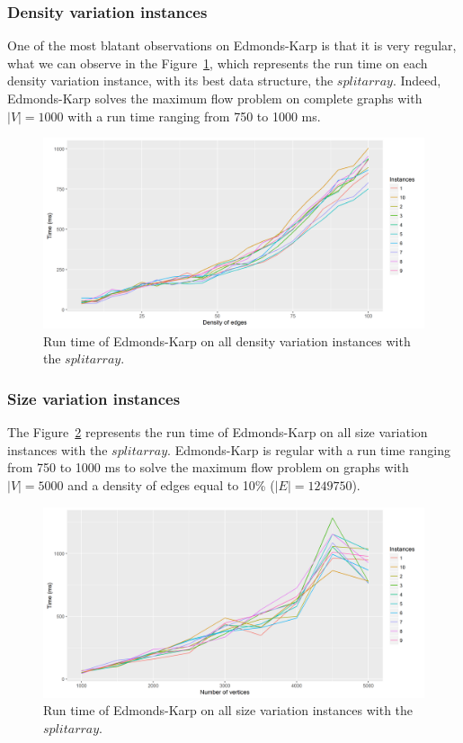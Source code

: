 \subsubsection{Density variation instances}
One of the most blatant observations on Edmonds-Karp is that it is very regular, what we can observe in the Figure~\ref{fig:EKmean}, which represents the run time on each density variation instance, with its best data structure, the $split array$. Indeed, Edmonds-Karp solves the maximum flow problem on complete graphs with $|V|=1000$ with a run time ranging from 750 to 1000 ms.
\begin{figure}[H]
\begin{center}
\includegraphics[scale=0.6]{images/results/EKmean.png}
\caption{Run time of Edmonds-Karp on all density variation instances with the $split array$.}
\label{fig:EKmean}
\end{center}
\end{figure}
\subsubsection{Size variation instances}
The Figure~\ref{fig:EKmeansize} represents the run time of Edmonds-Karp on all size variation instances with the $split array$. Edmonds-Karp is regular with a run time ranging from 750 to 1000 ms to solve the maximum flow problem on graphs with $|V|=5000$ and a density of edges equal to 10\% ($|E|=1249750$).
\begin{figure}[H]
\begin{center}
\includegraphics[scale=0.55]{images/results/EKmeansize2.png}
\caption{Run time of Edmonds-Karp on all size variation instances with the $split array$.}
\label{fig:EKmeansize}
\end{center}
\end{figure}
